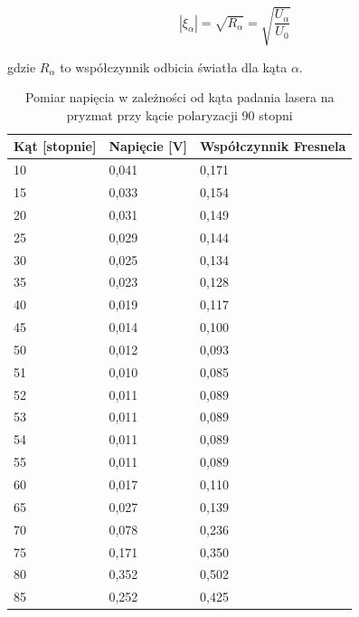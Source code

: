 \documentclass[polish, a4paper]{article}
\begin{document}
\begin{equation}
| \xi_\alpha | = \sqrt{R_\alpha} = \sqrt{\frac{U_\alpha}{U_0}}
\end{equation}

gdzie $R_\alpha$ to współczynnik odbicia światła dla kąta $\alpha$.

\begin{table}[H]
    \centering
    \begin{tabular}{|l|l|l|}
    \hline
        Kąt [stopnie] & Napięcie [V] & Współczynnik Fresnela \\ \hline
        10 & 0,041 & 0,171 \\ \hline
        15 & 0,033 & 0,154 \\ \hline
        20 & 0,031 & 0,149 \\ \hline
        25 & 0,029 & 0,144 \\ \hline
        30 & 0,025 & 0,134 \\ \hline
        35 & 0,023 & 0,128 \\ \hline
        40 & 0,019 & 0,117 \\ \hline
        45 & 0,014 & 0,100 \\ \hline
        50 & 0,012 & 0,093 \\ \hline
        51 & 0,010 & 0,085 \\ \hline
        52 & 0,011 & 0,089 \\ \hline
        53 & 0,011 & 0,089 \\ \hline
        54 & 0,011 & 0,089 \\ \hline
        55 & 0,011 & 0,089 \\ \hline
        60 & 0,017 & 0,110 \\ \hline
        65 & 0,027 & 0,139 \\ \hline
        70 & 0,078 & 0,236 \\ \hline
        75 & 0,171 & 0,350 \\ \hline
        80 & 0,352 & 0,502 \\ \hline
        85 & 0,252 & 0,425 \\ \hline
    \end{tabular}
    \caption{Pomiar napięcia w zależności od kąta padania lasera na pryzmat przy kącie polaryzacji 90 stopni}
\end{table}
\end{document}
